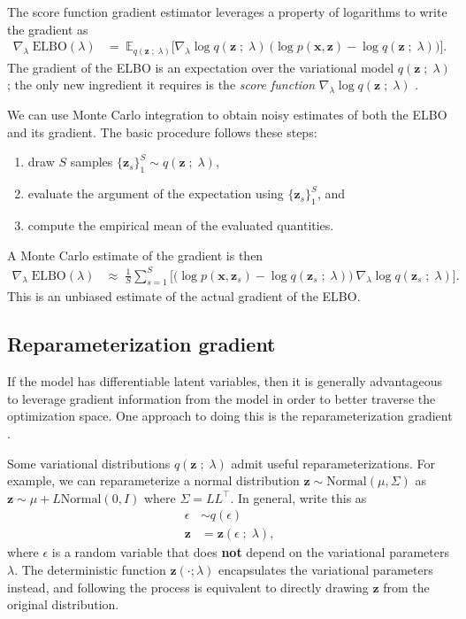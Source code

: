 The score function gradient estimator leverages a property of
logarithms to write the gradient as
\begin{align*}
  \nabla_\lambda\;
  \text{ELBO}(\lambda)
  &=\;
  \mathbb{E}_{q(\mathbf{z}\;;\;\lambda)}
  \big[
  \nabla_\lambda \log q(\mathbf{z}\;;\;\lambda)
  \:
  \big(
  \log p(\mathbf{x}, \mathbf{z})
  -
  \log q(\mathbf{z}\;;\;\lambda)
  \big)
  \big].
\end{align*}
The gradient of the ELBO is an expectation over the variational
model $q(\mathbf{z}\;;\;\lambda)$; the only new ingredient it requires is the
\emph{score function} $\nabla_\lambda \log q(\mathbf{z}\;;\;\lambda)$
\citep{paisley2012variational,ranganath2014black}.

We can use Monte Carlo integration to obtain noisy estimates of both the ELBO
and its gradient. The basic procedure follows these steps:
\begin{enumerate}
  \item draw $S$ samples $\{\mathbf{z}_s\}_1^S \sim q(\mathbf{z}\;;\;\lambda)$,
  \item evaluate the argument of the expectation using $\{\mathbf{z}_s\}_1^S$, and
  \item compute the empirical mean of the evaluated quantities.
\end{enumerate}

A Monte Carlo estimate of the gradient is then
\begin{align*}
  \nabla_\lambda\;
  \text{ELBO}(\lambda)
  &\approx\;
  \frac{1}{S}
  \sum_{s=1}^{S}
  \big[
  \big(
  \log p(\mathbf{x}, \mathbf{z}_s)
  -
  \log q(\mathbf{z}_s\;;\;\lambda)
  \big)
  \:
  \nabla_\lambda \log q(\mathbf{z}_s\;;\;\lambda)
  \big].
\end{align*}
This is an unbiased estimate of the actual gradient of the ELBO.

\subsection{Reparameterization gradient}

If the model has differentiable latent variables, then it is generally
advantageous to leverage gradient information from the model in order to
better traverse the optimization space. One approach to doing this is
the reparameterization gradient
\citep{kingma2014auto,rezende2014stochastic}.

Some variational distributions $q(\mathbf{z}\;;\;\lambda)$ admit useful
reparameterizations. For example, we can reparameterize a normal distribution
$\mathbf{z} \sim \text{Normal}(\mu, \Sigma)$ as
$\mathbf{z} \sim \mu + L \text{Normal}(0, I)$ where $\Sigma = LL^\top$. In general, write
this as
\begin{align*}
  \epsilon &\sim q(\epsilon)\\
  \mathbf{z} &= \mathbf{z}(\epsilon \;;\; \lambda),
\end{align*}
where $\epsilon$ is a random variable that does \textbf{not} depend on the
variational parameters $\lambda$. The deterministic function
$\mathbf{z}(\cdot;\lambda)$ encapsulates the variational parameters instead,
and following the process is equivalent to directly drawing $\mathbf{z}$ from
the original distribution.

